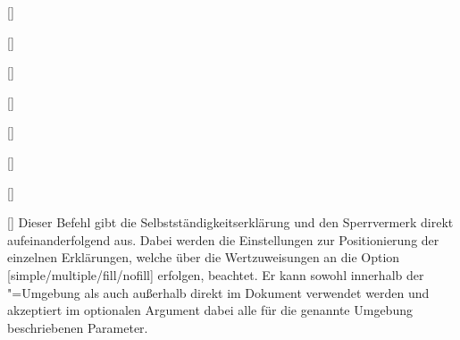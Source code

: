 
\begin{Declaration}{\LParameter}
\begin{Declaration}{[]}
\begin{Declaration}[v2.02]{%
  []%
}
\begin{Declaration}[v2.02]{[]}
\begin{Declaration}{[\PSet]}
\begin{Declaration}{[]}
\begin{Declaration}{[]}
\begin{Declaration}{[]}
\begin{Declaration}{[]}
\printdeclarationlist%
%
%
Dieser Befehl gibt die Selbstständigkeitserklärung und den Sperrvermerk direkt 
aufeinanderfolgend aus. Dabei werden die Einstellungen zur Positionierung der 
einzelnen Erklärungen, welche über die Wertzuweisungen an die Option 
[simple/multiple/fill/nofill] erfolgen, beachtet. Er kann 
sowohl innerhalb der "=Umgebung als auch außerhalb 
direkt im Dokument verwendet werden und akzeptiert im optionalen Argument dabei 
alle für die genannte Umgebung beschriebenen Parameter.
\end{Declaration}
\end{Declaration}
\end{Declaration}
\end{Declaration}
\end{Declaration}
\end{Declaration}
\end{Declaration}
\end{Declaration}
\end{Declaration}

